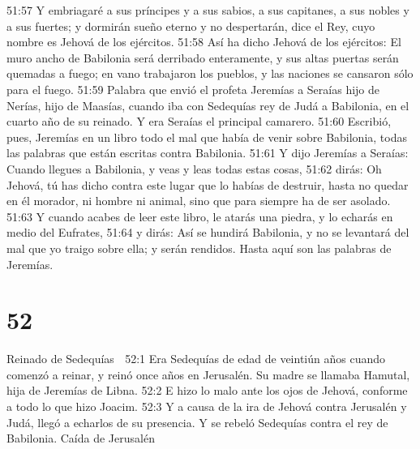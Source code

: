 51:57 Y embriagaré a sus príncipes y a sus sabios, a sus capitanes, a sus nobles y a sus fuertes; y dormirán sueño eterno y no despertarán, dice el Rey, cuyo nombre es Jehová de los ejércitos.  
51:58 Así ha dicho Jehová de los ejércitos: El muro ancho de Babilonia será derribado enteramente, y sus altas puertas serán quemadas a fuego; en vano trabajaron los pueblos, y las naciones se cansaron sólo para el fuego.  
51:59 Palabra que envió el profeta Jeremías a Seraías hijo de Nerías, hijo de Maasías, cuando iba con Sedequías rey de Judá a Babilonia, en el cuarto año de su reinado. Y era Seraías el principal camarero.  
51:60 Escribió, pues, Jeremías en un libro todo el mal que había de venir sobre Babilonia, todas las palabras que están escritas contra Babilonia.  
51:61 Y dijo Jeremías a Seraías: Cuando llegues a Babilonia, y veas y leas todas estas cosas,  
51:62 dirás: Oh Jehová, tú has dicho contra este lugar que lo habías de destruir, hasta no quedar en él morador, ni hombre ni animal, sino que para siempre ha de ser asolado.  
51:63 Y cuando acabes de leer este libro, le atarás una piedra, y lo echarás en medio del Eufrates,  
51:64 y dirás: Así se hundirá Babilonia, y no se levantará del mal que yo traigo sobre ella; y serán rendidos. Hasta aquí son las palabras de Jeremías. 

\chapter{52}

Reinado de Sedequías 

52:1 Era Sedequías de edad de veintiún años cuando comenzó a reinar, y reinó once años en Jerusalén. Su madre se llamaba Hamutal, hija de Jeremías de Libna.  
52:2 E hizo lo malo ante los ojos de Jehová, conforme a todo lo que hizo Joacim.  
52:3 Y a causa de la ira de Jehová contra Jerusalén y Judá, llegó a echarlos de su presencia. Y se rebeló Sedequías contra el rey de Babilonia.  
Caída de Jerusalén  
 
